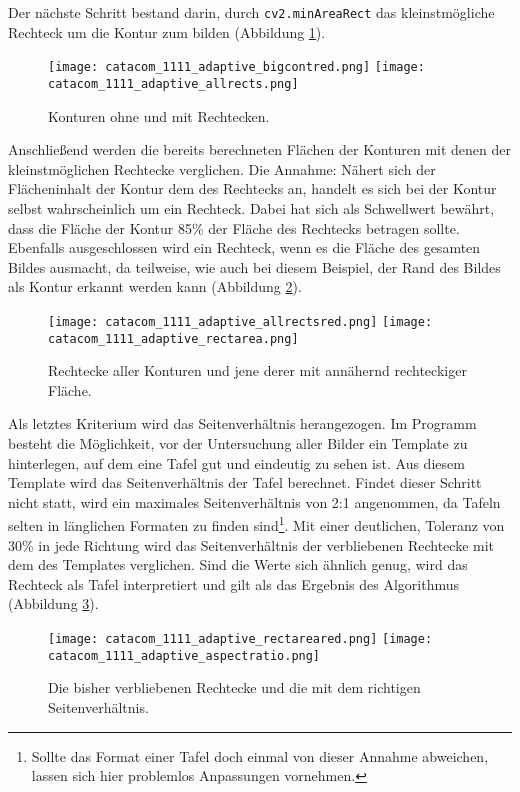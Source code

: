Der nächste Schritt bestand darin, durch \verb|cv2.minAreaRect| das kleinstmögliche Rechteck um die Kontur zum bilden (Abbildung \ref{fig:adaptiverectangles}).
\begin{figure}[h!]
\texttt{[image: catacom\_1111\_adaptive\_bigcontred.png]}
\texttt{[image: catacom\_1111\_adaptive\_allrects.png]}
\caption{Konturen ohne und mit Rechtecken.}
\label{fig:adaptiverectangles}
\end{figure}

Anschließend werden die bereits berechneten Flächen der Konturen mit denen der kleinstmöglichen Rechtecke verglichen. Die Annahme: Nähert sich der Flächeninhalt der Kontur dem des Rechtecks an, handelt es sich bei der Kontur selbst wahrscheinlich um ein Rechteck. Dabei hat sich als Schwellwert bewährt, dass die Fläche der Kontur 85\% der Fläche des Rechtecks betragen sollte. Ebenfalls ausgeschlossen wird ein Rechteck, wenn es die Fläche des gesamten Bildes ausmacht, da teilweise, wie auch bei diesem Beispiel, der Rand des Bildes als Kontur erkannt werden kann (Abbildung \ref{fig:adaptivrect}).
\begin{figure}[h!]
\texttt{[image: catacom\_1111\_adaptive\_allrectsred.png]}
\texttt{[image: catacom\_1111\_adaptive\_rectarea.png]}
\caption{Rechtecke aller Konturen und jene derer mit annähernd rechteckiger Fläche.}
\label{fig:adaptivrect}
\end{figure}

Als letztes Kriterium wird das Seitenverhältnis herangezogen. Im Programm besteht die Möglichkeit, vor der Untersuchung aller Bilder ein Template zu hinterlegen, auf dem eine Tafel gut und eindeutig zu sehen ist. Aus diesem Template wird das Seitenverhältnis der Tafel berechnet. Findet dieser Schritt nicht statt, wird ein maximales Seitenverhältnis von 2:1 angenommen, da Tafeln selten in länglichen Formaten zu finden sind\footnote{Sollte das Format einer Tafel doch einmal von dieser Annahme abweichen, lassen sich hier problemlos Anpassungen vornehmen.}. Mit einer deutlichen, Toleranz von 30\% in jede Richtung wird das Seitenverhältnis der verbliebenen Rechtecke mit dem des Templates verglichen. Sind die Werte sich ähnlich genug, wird das Rechteck als Tafel interpretiert und gilt als das Ergebnis des Algorithmus (Abbildung \ref{fig:aspectratio}).
\begin{figure}[h!]
\texttt{[image: catacom\_1111\_adaptive\_rectareared.png]}
\texttt{[image: catacom\_1111\_adaptive\_aspectratio.png]}
\caption{Die bisher verbliebenen Rechtecke und die mit dem richtigen Seitenverhältnis.}
\label{fig:aspectratio}
\end{figure}
 

